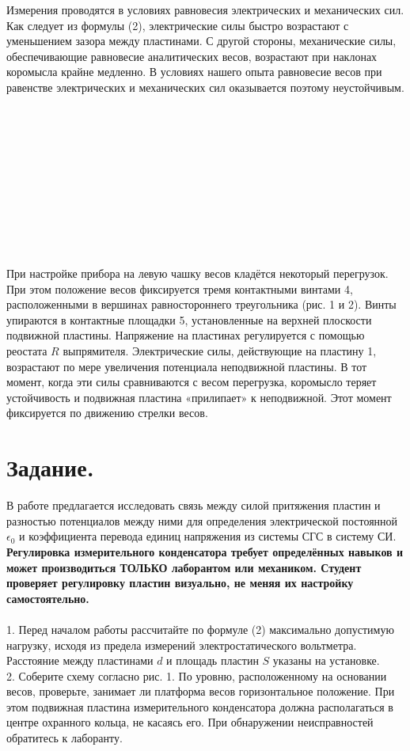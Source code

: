 Измерения проводятся в условиях равновесия электрических и механических сил. Как следует из формулы (2), электрические силы быстро возрастают с уменьшением зазора между пластинами. С другой стороны, механические силы, обеспечивающие равновесие аналитических весов, возрастают при наклонах коромысла крайне медленно. В условиях нашего опыта равновесие весов при равенстве электрических и механических сил оказывается поэтому неустойчивым.
\\
\\
\\
\\
\\
\\
\\
\\
\\
\\
\\
\\
При настройке прибора на левую чашку весов кладётся некоторый перегрузок. При этом положение весов фиксируется тремя контактными винтами 4, расположенными в вершинах равностороннего треугольника (рис. 1 и 2). Винты упираются в контактные площадки 5, установленные на верхней плоскости подвижной пластины. Напряжение на пластинах регулируется с помощью реостата $R$ выпрямителя. Электрические силы, действующие на пластину 1, возрастают по мере увеличения потенциала неподвижной пластины. В тот момент, когда эти силы сравниваются с весом перегрузка, коромысло теряет устойчивость и подвижная пластина «прилипает» к неподвижной. Этот момент фиксируется по движению стрелки весов.
   
\section{\label{sec:level1}Задание.}

В работе предлагается исследовать связь между силой притяжения пластин и разностью потенциалов между ними для определения электрической постоянной $\epsilon_0$ и коэффициента перевода единиц напряжения из системы СГС в систему СИ.\\

\textbf{Регулировка измерительного конденсатора требует определённых навыков и может производиться ТОЛЬКО лаборантом или механиком. Студент проверяет регулировку пластин визуально, не меняя их настройку самостоятельно.}
\\
\\
1. Перед началом работы рассчитайте по формуле (2) максимально допустимую нагрузку, исходя из предела измерений электростатического вольтметра. Расстояние между пластинами $d$ и площадь пластин $S$ указаны на установке.\\
2. Соберите схему согласно рис. 1. По уровню, расположенному на основании весов, проверьте, занимает ли платформа весов горизонтальное положение. При этом подвижная пластина измерительного конденсатора должна располагаться в центре охранного кольца, не касаясь его. При обнаружении неисправностей обратитесь к лаборанту.


